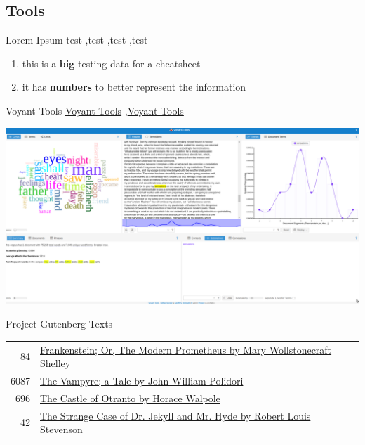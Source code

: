 \documentclass[10pt,a4paper]{article}
\begin{document}
\begin{multicols}{3}
\section{Tools}



\begin{textbox}{Lorem Ipsum}
test  \sep test \sep test \sep test

\bigskip

\begin{enumerate}
\item this is a \textbf {big} testing data for a cheatsheet 
\item it has \textbf {numbers} to better represent the information
\end{enumerate}

\end{textbox}


\begin{textbox}{Voyant Tools}
 \href{https://voyant-tools.org/}{Voyant Tools} \sep \href{https://voyant-tools.org/}{Voyant Tools}

\includegraphics[width=\textwidth]{voyant.png}
\end{textbox}




\begin{textbox}{Project Gutenberg Texts}
\begin{tabular}{r|p{}}\scriptsize
    84 & \href{http://www.gutenberg.org/ebooks/84}{Frankenstein; Or, The Modern Prometheus by Mary Wollstonecraft Shelley} \\
    6087 & \href{https://www.gutenberg.org/ebooks/6087}{The Vampyre; a Tale by John William Polidori} \\
    696 & \href{https://www.gutenberg.org/ebooks/696}{The Castle of Otranto by Horace Walpole} \\
    42 & \href{https://www.gutenberg.org/ebooks/42}{The Strange Case of Dr. Jekyll and Mr. Hyde by Robert Louis Stevenson}
\end{tabular}


\end{textbox}
\end{multicols}
\end{document}
